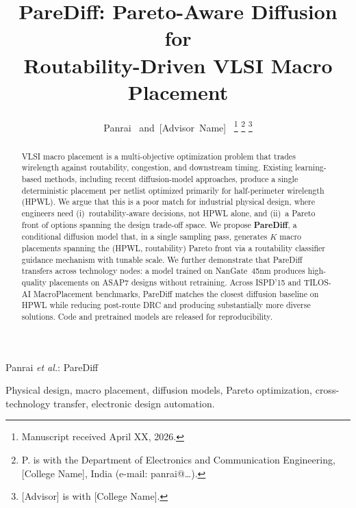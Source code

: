 \documentclass[journal,onecolumn,11pt]{IEEEtran}
\begin{document}
\title{PareDiff: Pareto-Aware Diffusion for\\
       Routability-Driven VLSI Macro Placement}

\author{Panrai~
        and~[Advisor~Name]~
\thanks{Manuscript received April XX, 2026.}
\thanks{P. is with the Department of Electronics and Communication Engineering,
[College Name], India (e-mail: panrai@\dots).}
\thanks{[Advisor] is with [College Name].}
}

%
{Panrai \MakeLowercase{\textit{et al.}}: PareDiff}

\maketitle

\begin{abstract}
VLSI macro placement is a multi-objective optimization problem that trades wirelength against routability, congestion, and downstream timing. Existing learning-based methods, including recent diffusion-model approaches, produce a single deterministic placement per netlist optimized primarily for half-perimeter wirelength (HPWL). We argue that this is a poor match for industrial physical design, where engineers need (i)~routability-aware decisions, not HPWL alone, and (ii)~a Pareto front of options spanning the design trade-off space. We propose \textbf{PareDiff}, a conditional diffusion model that, in a single sampling pass, generates $K$ macro placements spanning the (HPWL, routability) Pareto front via a routability classifier guidance mechanism with tunable scale. We further demonstrate that PareDiff transfers across technology nodes: a model trained on NanGate~45nm produces high-quality placements on ASAP7 designs without retraining. Across ISPD'15 and TILOS-AI MacroPlacement benchmarks, PareDiff matches the closest diffusion baseline on HPWL while reducing post-route DRC and producing substantially more diverse solutions. Code and pretrained models are released for reproducibility.
\end{abstract}

\begin{IEEEkeywords}
Physical design, macro placement, diffusion models, Pareto optimization, cross-technology transfer, electronic design automation.
\end{IEEEkeywords}
\end{document}
